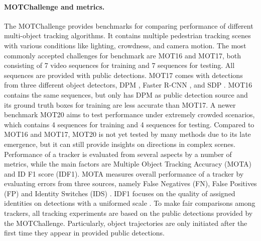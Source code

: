 \documentclass[final]{cvpr}
\begin{document}
\paragraph{MOTChallenge and metrics.}
The MOTChallenge provides benchmarks for comparing performance of different multi-object tracking algorithms. It contains multiple pedestrian tracking scenes with various conditions like lighting, crowdness, and camera motion. The most commonly accepted challenges for benchmark are MOT16 and MOT17, both consisting of 7 video sequences for training and 7 sequences for testing. All sequences are provided with public detections. MOT17 comes with detections from three different object detectors, DPM \cite{Felzenszwalb2010}, Faster R-CNN \cite{Ren2015}, and SDP \cite{Yang2016}. MOT16 contains the same sequences, but only has DPM as public detection source and its ground truth boxes for training are less accurate than MOT17. A newer benchmark MOT20 aims to test performance under extremely crowded scenarios, which contains 4 sequences for training and 4 sequences for testing. Compared to MOT16 and MOT17, MOT20 is not yet tested by many methods due to its late emergence, but it can still provide insights on directions in complex scenes. Performance of a tracker is evaluated from several aspects by a number of metrics, while the main factors are Multiple Object Tracking Accuracy (MOTA) and ID F1 score (IDF1). MOTA measures overall performance of a tracker by evaluating errors from three sources, namely False Negatives (FN), False Positives (FP) and Identity Switches (IDS) \cite{Milan2016a}. IDF1 focuses on the quality of assigned identities on detections with a uniformed scale \cite{Ristani2016}. 
To make fair comparisons among trackers, all tracking experiments are based on the public detections provided by the MOTChallenge. Particularly, object trajectories are only initiated after the first time they appear in provided public detections.
\end{document}

